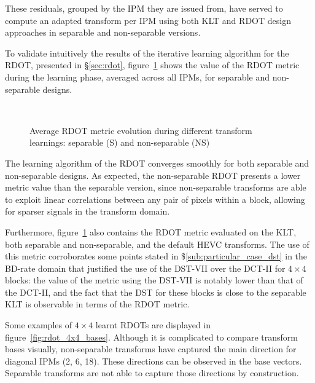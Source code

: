 \documentclass[11pt,a4paper,openright,twoside]{book}
\numberwithin{equation}{section} %
\numberwithin{figure}{section} %
\numberwithin{table}{section} %
\begin{document}
These residuals, grouped by the \ac{IPM} they are issued from, have served to
compute an adapted transform per \ac{IPM} using both \ac{KLT} and \ac{RDOT}
design approaches in separable and non-separable versions.

To validate intuitively the results of the iterative learning algorithm for
the \ac{RDOT}, presented in
\S\ref{sec:rdot},
figure~\ref{fig:rdot_metric_learning} shows the value of the \ac{RDOT} metric
during the learning phase, averaged across all \acp{IPM}, for separable and
non-separable designs.

\begin{figure}[tb]
	\centering
	\\	
	\caption{Average \acs{RDOT} metric evolution during different transform
	learnings: separable (S) and non-separable (NS)}
	\label{fig:rdot_metric_learning}
\end{figure}

The learning algorithm of the \ac{RDOT} converges smoothly for both separable
and non-separable designs.
As expected, the non-separable \ac{RDOT} presents a lower metric value than
the separable version, since non-separable transforms are able to exploit
linear correlations between any pair of pixels within a block, allowing for
sparser signals in the transform domain.

Furthermore, figure~\ref{fig:rdot_metric_learning} also contains the \ac{RDOT}
metric evaluated on the \ac{KLT}, both separable and non-separable, and the
default \ac{HEVC} transforms.
The use of this metric corroborates some points stated in
\$\ref{sub:particular_case_dst} in the \ac{BD}-rate domain that justified the
use of the \ac{DST}-VII over the \ac{DCT}-II for $4\times4$ blocks:
the value of the metric using the \ac{DST}-VII is notably lower than that of
the \ac{DCT}-II, and the fact that the \ac{DST} for these blocks is close to
the separable \ac{KLT} is observable in terms of the \ac{RDOT} metric.

Some examples of $4\times4$ learnt \acp{RDOT} are displayed in
figure~\ref{fig:rdot_4x4_bases}.
Although it is complicated to compare transform bases visually, non-separable
transforms have captured the main direction for diagonal \acp{IPM} (2, 6, 18).
These directions can be observed in the base vectors.
Separable transforms are not able to capture those directions by construction.
\end{document}
